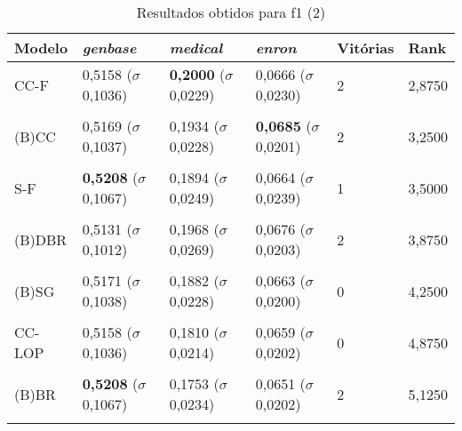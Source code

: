 \begin{table}[htbp]
	\centering
	\caption{Resultados obtidos para f1 (2)}
		\begin{tabular}
        { p{0.88in} p{0.88in} p{0.88in} p{0.88in} p{0.88in} p{0.88in} }
        
        \hline
Modelo & \textit{genbase} & \textit{medical} & \textit{enron} & \textbf{Vitórias} & \textbf{Rank} \\ 
\hline

CC-F & 0,5158 \newline ($\sigma$ 0,1036) & \textbf{0,2000} \newline ($\sigma$ 0,0229) & 0,0666 \newline ($\sigma$ 0,0230) & 2 & 2,8750 \\ \\
(B)CC & 0,5169 \newline ($\sigma$ 0,1037) & 0,1934 \newline ($\sigma$ 0,0228) & \textbf{0,0685} \newline ($\sigma$ 0,0201) & 2 & 3,2500 \\ \\
S-F & \textbf{0,5208} \newline ($\sigma$ 0,1067) & 0,1894 \newline ($\sigma$ 0,0249) & 0,0664 \newline ($\sigma$ 0,0239) & 1 & 3,5000 \\ \\
(B)DBR & 0,5131 \newline ($\sigma$ 0,1012) & 0,1968 \newline ($\sigma$ 0,0269) & 0,0676 \newline ($\sigma$ 0,0203) & 2 & 3,8750 \\ \\
(B)SG & 0,5171 \newline ($\sigma$ 0,1038) & 0,1882 \newline ($\sigma$ 0,0228) & 0,0663 \newline ($\sigma$ 0,0200) & 0 & 4,2500 \\ \\
CC-LOP & 0,5158 \newline ($\sigma$ 0,1036) & 0,1810 \newline ($\sigma$ 0,0214) & 0,0659 \newline ($\sigma$ 0,0202) & 0 & 4,8750 \\ \\
(B)BR & \textbf{0,5208} \newline ($\sigma$ 0,1067) & 0,1753 \newline ($\sigma$ 0,0234) & 0,0651 \newline ($\sigma$ 0,0202) & 2 & 5,1250 \\ \\

        \hline
        \end{tabular}
	\label{tab:metricsForf1_2}
\end{table}
